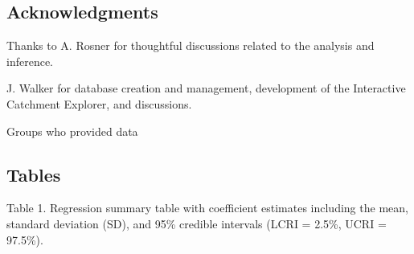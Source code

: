 \documentclass[]{article}
\begin{document}
\subsection{Acknowledgments}\label{acknowledgments}

Thanks to A. Rosner for thoughtful discussions related to the analysis
and inference.

J. Walker for database creation and management, development of the
Interactive Catchment Explorer, and discussions.

Groups who provided data

\subsection{Tables}\label{tables}

Table 1. Regression summary table with coefficient estimates including
the mean, standard deviation (SD), and 95\% credible intervals (LCRI =
2.5\%, UCRI = 97.5\%).
\end{document}
